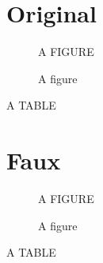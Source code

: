 \documentclass{article}
\begin{document}
\section{Original}
\OriginalCaptions

\begin{figure}[!ht]
\centering A FIGURE
\caption{A figure}
\end{figure}

\begin{table}[!ht]
\centering A TABLE
\caption{A table}
\end{table}

\section{Faux}
\FakeCaptions

\begin{figure}[!ht]
\centering A FIGURE
\caption{A figure}
\end{figure}

\begin{table}[!ht]
\centering A TABLE
\caption{A table}
\end{table}
\end{document}
